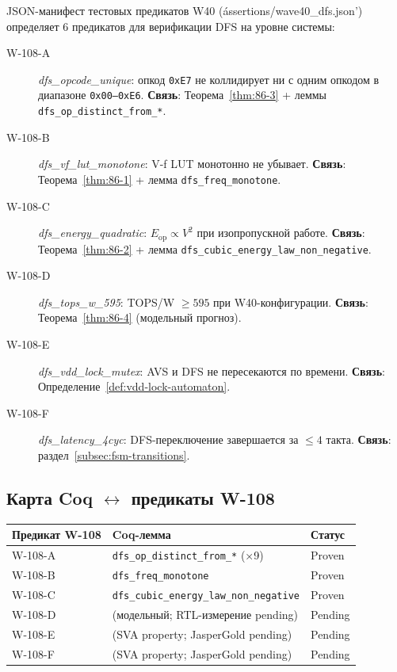 JSON-манифест тестовых предикатов W40 (\'assertions/wave40\_dfs.json')~\cite{trios886}
определяет 6 предикатов для верификации DFS на уровне системы:

\begin{description}
  \item[W-108-A] \textit{dfs\_opcode\_unique}: опкод \texttt{0xE7} не коллидирует
        ни с одним опкодом в диапазоне \texttt{0x00--0xE6}.
        \textbf{Связь}: Теорема~\ref{thm:86-3} + леммы \texttt{dfs\_op\_distinct\_from\_*}.
  \item[W-108-B] \textit{dfs\_vf\_lut\_monotone}: V-f LUT монотонно не убывает.
        \textbf{Связь}: Теорема~\ref{thm:86-1} + лемма \texttt{dfs\_freq\_monotone}.
  \item[W-108-C] \textit{dfs\_energy\_quadratic}: $E_{\mathrm{op}} \propto V^2$
        при изопропускной работе.
        \textbf{Связь}: Теорема~\ref{thm:86-2} + лемма \texttt{dfs\_cubic\_energy\_law\_non\_negative}.
  \item[W-108-D] \textit{dfs\_tops\_w\_595}: TOPS/W $\geq 595$ при W40-конфигурации.
        \textbf{Связь}: Теорема~\ref{thm:86-4} (модельный прогноз).
  \item[W-108-E] \textit{dfs\_vdd\_lock\_mutex}: AVS и DFS не пересекаются по времени.
        \textbf{Связь}: Определение~\ref{def:vdd-lock-automaton}.
  \item[W-108-F] \textit{dfs\_latency\_4cyc}: DFS-переключение завершается за $\leq 4$ такта.
        \textbf{Связь}: раздел~\ref{subsec:fsm-transitions}.
\end{description}

\subsection{Карта Coq $\leftrightarrow$ предикаты W-108}
\label{subsec:coq-w108-map}

\begin{center}
\begin{tabular}{lll}
\hline
Предикат W-108 & Coq-лемма & Статус \\
\hline
W-108-A & \texttt{dfs\_op\_distinct\_from\_*} (×9) & Proven \\
W-108-B & \texttt{dfs\_freq\_monotone}               & Proven \\
W-108-C & \texttt{dfs\_cubic\_energy\_law\_non\_negative} & Proven \\
W-108-D & (модельный; RTL-измерение pending)        & Pending \\
W-108-E & (SVA property; JasperGold pending)         & Pending \\
W-108-F & (SVA property; JasperGold pending)         & Pending \\
\hline
\end{tabular}
\end{center}

